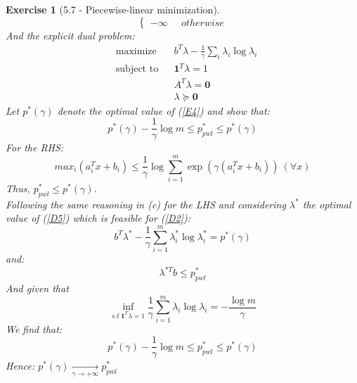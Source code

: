 \documentclass[11pt]{article}
\theoremstyle{exo}
\newtheorem*{exercise}{Exercise}
\newcommand{\1}{\mathbf{1}}
\newcommand{\0}{\mathbf{0}}
\begin{document}
\begin{exercise}[5.7 - Piecewise-linear minimization]
\[\begin{cases}
-\infty\phantom{abc}otherwise
\end{cases}\]
And the explicit dual problem:
\begin{equation}
\label{D5}
\begin{aligned}
& {\text{maximize}} & & b^T\lambda-\frac{1}{\gamma}\sum_i\lambda_i\log\lambda_i \\
& \text{subject to} & & \1^T\lambda=1\\
&  & & A^T\lambda=\0\\
&  & & \lambda\succeq\0
\end{aligned}
\end{equation}
Let $p^*(\gamma)$ denote the optimal value of (\ref{E4}) and show that:
\[p^*(\gamma)-\frac{1}{\gamma}\log m\leq p^*_{pwl}\leq p^*(\gamma)\]
For the RHS:
\[max_i(a_i^Tx+b_i)\leq\frac{1}{\gamma}\log\sum_{i=1}^m\exp(\gamma(a_i^Tx+b_i))\:(\forall x)\]
Thus, $p^*_{pwl}\leq p^*(\gamma)$.\\
Following the same reasoning in (c) for the LHS and considering $\lambda^*$  the optimal value of (\ref{D5}) which is feasible for (\ref{D2}):
\[b^T\lambda^*-\frac{1}{\gamma}\sum_{i=1}^m\lambda^*_i\log\lambda^*_i=p^*(\gamma) \]
and:
\[\lambda^{*T}b\leq p^*_{pwl}\]
And given that
\[
\inf_{s.t\:\1^T\lambda=1}\frac{1}{\gamma}\sum_{i=1}^m\lambda_i\log\lambda_i=-\frac{\log m}{\gamma}
\]
We find that:
\[p^*(\gamma)-\frac{1}{\gamma}\log m\leq p^*_{pwl}\leq p^*(\gamma)\]
Hence: $p^*(\gamma)\xrightarrow[\gamma\to+\infty]{}p^*_{pwl}$
\end{exercise}
\end{document}
